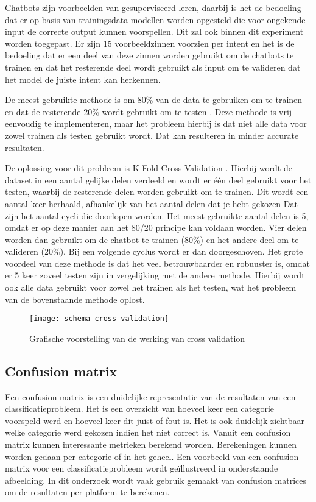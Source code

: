 Chatbots zijn voorbeelden van gesuperviseerd leren, daarbij is het de bedoeling dat er op basis van trainingsdata modellen worden opgesteld die voor ongekende input de correcte output kunnen voorspellen. Dit zal ook binnen dit experiment worden toegepast. Er zijn 15 voorbeeldzinnen voorzien per intent en het is de bedoeling dat er een deel van deze zinnen worden gebruikt om de chatbots te trainen en dat het resterende deel wordt gebruikt als input om te valideren dat het model de juiste intent kan herkennen.

De meest gebruikte methode is om 80\% van de data te gebruiken om te trainen en dat de resterende 20\% wordt gebruikt om te testen \autocite{Desmarais2018}. Deze methode is vrij eenvoudig te implementeren, maar het probleem hierbij is dat niet alle data voor zowel trainen als testen gebruikt wordt. Dat kan resulteren in minder accurate resultaten.

De oplossing voor dit probleem is K-Fold Cross Validation \autocite{Desmarais2018}. Hierbij wordt de dataset in een aantal gelijke delen verdeeld en wordt er één deel gebruikt voor het testen, waarbij de resterende delen worden gebruikt om te trainen. Dit wordt een aantal keer herhaald, afhankelijk van het aantal delen dat je hebt gekozen Dat zijn het aantal cycli die doorlopen worden. Het meest gebruikte aantal delen is 5, omdat er op deze manier aan het 80/20 principe kan voldaan worden. Vier delen worden dan gebruikt om de chatbot te trainen (80\%) en het andere deel om te valideren (20\%). Bij een volgende cyclus wordt er dan doorgeschoven. Het grote voordeel van deze methode is dat het veel betrouwbaarder en robuuster is, omdat er 5 keer zoveel testen zijn in vergelijking met de andere methode. Hierbij wordt ook alle data gebruikt voor zowel het trainen als het testen, wat het probleem van de bovenstaande methode oplost.

\begin{figure}[H]
    \label{fig:cross-validation-schema}
    \centering
    \texttt{[image: schema-cross-validation]}
    \caption{Grafische voorstelling van de werking van cross validation}
\end{figure}

\subsection{Confusion matrix}
\label{subsec:validatie-confusion-matrix}

Een confusion matrix is een duidelijke representatie van de resultaten van een classificatieprobleem. Het is een overzicht van hoeveel keer een categorie voorspeld werd en hoeveel keer dit juist of fout is. Het is ook duidelijk zichtbaar welke categorie werd gekozen indien het niet correct is. Vanuit een confusion matrix kunnen  interessante metrieken berekend worden. Berekeningen kunnen worden gedaan per categorie of in het geheel. Een voorbeeld van een confusion matrix voor een classificatieprobleem wordt geïllustreerd in onderstaande afbeelding. In dit onderzoek wordt vaak gebruik gemaakt van confusion matrices om de resultaten per platform te berekenen.

